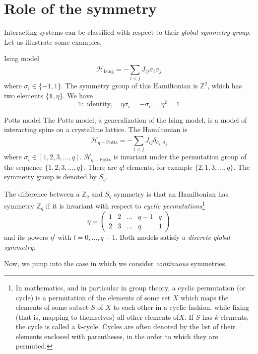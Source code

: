 \documentclass[../../Main/Main.tex]{subfiles}
\begin{document}
\section{Role of the symmetry}
Interacting systems can be classified with respect to their \emph{global symmetry group}. Let us illustrate some examples.
\begin{example}{Ising model}{}
  \begin{equation}
    \mathcal{H}_{\text{Ising}} = - \sum_{i<j}^{} J_{ij} \sigma _i \sigma _j
  \end{equation}
  where \( \sigma _i \in \{ -1,1 \}   \). The symmetry group of this Hamiltonian is \( \mathbb{Z}^2 \), which has two elements \( \{ \mathbb{1}, \eta  \}   \). We have
  \begin{equation*}
    \mathbb{1}: \text{ identity}, \quad \eta \sigma _i = - \sigma _i, \quad \eta ^2 = \mathbb{1}
  \end{equation*}
\end{example}
\begin{example}{Potts model}{}
The Potts model, a generalization of the Ising model, is a model of interacting spins on a crystalline lattice. The Hamiltonian is 
  \begin{equation}
    \mathcal{H}_{q- \text{Potts}} = - \sum_{i<j}^{} J_{ij} \delta _{\sigma _i, \sigma _j}
  \end{equation}
  where \( \sigma _i \in [1,2,3,\dots,q] \). \( \mathcal{H}_{q- \text{Potts}} \)  is invariant under the permutation group of the sequence \( \{ 1,2,3,\dots,q \}   \). There are \( q! \) elements, for example \( \{ 2,1,3,\dots,q \}   \). The symmetry group is denoted by \( S_q \).
\end{example}
\begin{remark}
The difference between a \( \mathbb{Z}_q \) and \( S_q \) symmetry is that an Hamiltonian has symmetry \( \mathbb{Z}_q \) if it is invariant with respect to \emph{cyclic permutations}\footnote{In mathematics, and in particular in group theory, a cyclic permutation (or cycle) is a permutation of the elements of some set \(X\) which maps the elements of some subset \(S\) of \(X\) to each other in a cyclic fashion, while fixing (that is, mapping to themselves) all other elements of\(X\). If \(S\) has \(k\) elements, the cycle is called a \(k\)-cycle. Cycles are often denoted by the list of their elements enclosed with parentheses, in the order to which they are permuted.}
\begin{equation}
  \eta = \begin{pmatrix}
    1 & 2 & \dots & q-1 & q \\
    2 & 3 & \dots & q & 1
  \end{pmatrix}
\end{equation}
and its powers \( \eta ^l \) with \( l=0, \dots, q-1 \). Both models satisfy a \emph{discrete global symmetry}.
\end{remark}
Now, we jump into the case in which we consider \emph{continuous} symmetries.
\end{document}
